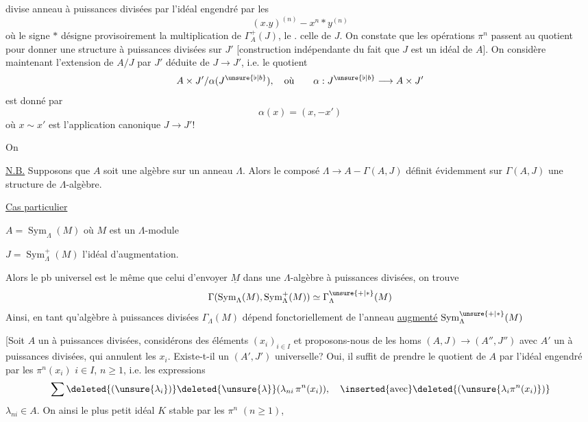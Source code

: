 divise  anneau à puissances divisées par l'idéal engendré par les
\[
(x.y)^{(n)}-x^n*y^{(n)}
\]
où le signe $*$ désigne provisoirement la multiplication de $\Gamma_A^+(J)$, le $.$ celle de $J$. On constate que les opérations $\pi^n$ passent au quotient  pour donner une structure  à puissances divisées sur $J'$ [construction indépendante du fait que $J$ est un idéal de $A$]. On considère maintenant l'extension de $A/J$ par  $J'$ déduite de $J\longrightarrow J'$, i.e. le quotient
\[
A\times J'/\alpha(J^{\unsure{\flat|b}}),\quad\text{où}\qquad
\alpha:J^{\unsure{\flat|b}}\longrightarrow A\times J'
\]
est donné par
\[
\alpha(x)=(x,-x')
\]
où $x\sim x'$ est l'application canonique $J\longrightarrow J'!$


On  

\uline{N.B.} Supposons que $A$ soit une algèbre sur un anneau $\Lambda$. Alors le composé $\Lambda\longrightarrow A-\Gamma(A,J)$ définit évidemment sur $\Gamma(A,J)$ une structure de $\Lambda$-algèbre.


\uline{Cas particulier}

$A=\operatorname{Sym}_{\Lambda}(M)$ où $M$ est un $\Lambda$-module

 $J=\operatorname{Sym}_{\Lambda}^{+}(M)$ l'idéal d'augmentation.

Alors le pb universel est le même que celui d'envoyer $\underline{M}$ dans une $\Lambda$-algèbre à puissances divisées, on trouve
\[
\Gamma(\operatorname{Sym}_{\Lambda}(M),\operatorname{Sym}_{\Lambda}^{+}(M))\simeq\Gamma_{\Lambda}^{\unsure{+|*}}(M)
\]
Ainsi, en tant qu'algèbre  à puissances divisées $\Gamma_{\Lambda}(M)$ dépend fonctoriellement de l'anneau \uline{augmenté} $\operatorname{Sym}_{\Lambda}^{\unsure{+|*}}(M)$ \unsure{---}



 [Soit $A$ un   à puissances divisées, considérons des éléments $(x_i)_{i\in I}$  et proposons-nous de  les homs $(A,J)\longrightarrow(A'',J'')$ avec $A'$ un   à puissances divisées, qui annulent les $x_i$. Existe-t-il un $(A',J')$ universelle? Oui, il suffit de prendre le quotient de $A$ par l'idéal  engendré par les $\pi^n(x_i)$ $i\in I$, $n\geq1$, i.e. les expressions
\[
\sum \deleted{(\unsure{\lambda_i})}\deleted{\unsure{\lambda}}(\lambda_{ni}\,\pi^n(x_i)),\quad\inserted{\text{avec}}\deleted{(\unsure{\lambda_i\pi^n(x_i)})}
\]
 $\lambda_{ni}\in A$. On  ainsi le plus petit idéal $K$ stable par les $\pi^n$ $(n\geq1)$,


